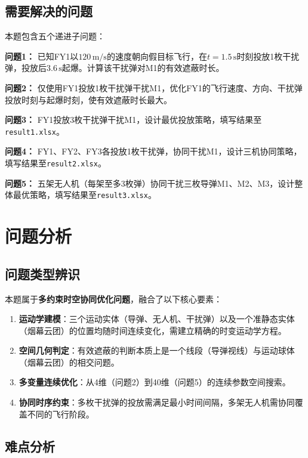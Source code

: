 \documentclass[12pt,a4paper]{ctexart}
\begin{document}
\subsection{需要解决的问题}

本题包含五个递进子问题：

\textbf{问题1：} 已知FY1以$120\,\text{m/s}$的速度朝向假目标飞行，在$t=1.5\,\text{s}$时刻投放1枚干扰弹，投放后$3.6\,\text{s}$起爆。计算该干扰弹对M1的有效遮蔽时长。

\textbf{问题2：} 仅使用FY1投放1枚干扰弹干扰M1，优化FY1的飞行速度、方向、干扰弹投放时刻与起爆时刻，使有效遮蔽时长最大。

\textbf{问题3：} FY1投放3枚干扰弹干扰M1，设计最优投放策略，填写结果至\texttt{result1.xlsx}。

\textbf{问题4：} FY1、FY2、FY3各投放1枚干扰弹，协同干扰M1，设计三机协同策略，填写结果至\texttt{result2.xlsx}。

\textbf{问题5：} 五架无人机（每架至多3枚弹）协同干扰三枚导弹M1、M2、M3，设计整体最优策略，填写结果至\texttt{result3.xlsx}。

\section{问题分析}

\subsection{问题类型辨识}

本题属于\textbf{多约束时空协同优化问题}，融合了以下核心要素：

\begin{enumerate}
    \item \textbf{运动学建模}：三个运动实体（导弹、无人机、干扰弹）以及一个准静态实体（烟幕云团）的位置均随时间连续变化，需建立精确的时变运动学方程。
    \item \textbf{空间几何判定}：有效遮蔽的判断本质上是一个线段（导弹视线）与运动球体（烟幕云团）的相交问题。
    \item \textbf{多变量连续优化}：从4维（问题2）到40维（问题5）的连续参数空间搜索。
    \item \textbf{协同时序约束}：多枚干扰弹的投放需满足最小时间间隔，多架无人机需协同覆盖不同的飞行阶段。
\end{enumerate}

\subsection{难点分析}
\end{document}
